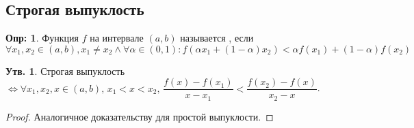 \documentclass[12pt]{article}
\theoremstyle{definition}
\newtheorem{defn}{Опр:}
\newtheorem{prop}{Утв.}
\begin{document}
\newpage
\subsection*{Строгая выпуклость}
\begin{defn}
	Функция $f$ на интервале $(a,b)$ называется , если 
	$$\forall x_1, x_2 \in (a,b), x_1 \neq x_2 \wedge \forall \alpha \in (0,1) \colon f(\alpha x_1 + (1 - \alpha) x_2) < \alpha f(x_1) + (1 - \alpha) f(x_2)$$
\end{defn}

\begin{prop}
	Строгая выпуклость $\Leftrightarrow \forall x_1, x_2, x \in (a,b),\, x_1 < x < x_2, \, \dfrac{f(x) - f(x_1)}{x - x_1} < \dfrac{f(x_2) - f(x)}{x_2 - x}$.
\end{prop}
\begin{proof}
	Аналогичное доказательству для простой выпуклости.
\end{proof}
\end{document}
